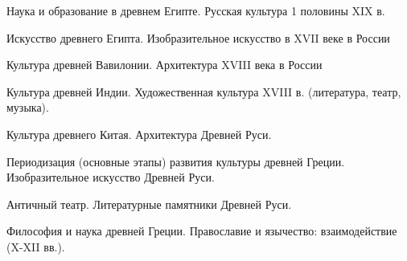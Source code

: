 \documentclass[
	14pt,
	a4paper,
	]
	{scrartcl}
\begin{document}
\vfill
\z Наука и образование в древнем Египте.
 \vfill
\z Русская культура 1 половины XIX в.
 \vfill

\vfill

\newpage


\shapk
{}
\setcounter{zad}{0}

\vfill
\z Искусство древнего Египта.
 \vfill
\z Изобразительное искусство в XVII веке в России
 \vfill

\vfill

\newpage


\shapk
{}
\setcounter{zad}{0}

\vfill
\z Культура древней Вавилонии.
 \vfill
\z Архитектура XVIII века в России
 \vfill

\vfill

\newpage


\shapk
{}
\setcounter{zad}{0}

\vfill
\z Культура древней Индии.
 \vfill
\z Художественная культура XVIII в. (литература, театр, музыка).
 \vfill

\vfill

\newpage


\shapk
{}
\setcounter{zad}{0}

\vfill
\z Культура древнего Китая.
 \vfill
\z Архитектура Древней Руси.
 \vfill

\vfill

\newpage


\shapk
{}
\setcounter{zad}{0}

\vfill
\z Периодизация (основные этапы) развития культуры древней Греции.
 \vfill
\z Изобразительное искусство Древней Руси.
 \vfill

\vfill

\newpage


\shapk
{}
\setcounter{zad}{0}

\vfill
\z Античный театр.
 \vfill
\z Литературные памятники Древней Руси.
 \vfill

\vfill

\newpage


\shapk
{}
\setcounter{zad}{0}

\vfill
\z Философия и наука древней Греции.
 \vfill
\z Православие и язычество: взаимодействие (X-XII вв.).
 \vfill

\vfill

\newpage
\end{document}
